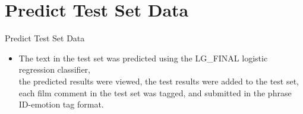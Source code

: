 \documentclass[
 size=14pt,
 paper=smartboard,  %
 mode=present, 		%
 display=slides, 	%
 style=tuliplab,  	%
 pauseslide,
 fleqn,leqno]{powerdot}
\begin{document}
\section{Predict Test Set Data}
\begin{slide}{Predict Test Set Data}
\begin{itemize}
  \item 
  The text in the test set was predicted using the LG_FINAL logistic regression classifier, 
\\the predicted results were viewed, the test results were added to the test set, 
 each film comment in the test set was tagged, and submitted in the phrase ID-emotion tag format.

\end{itemize}

\end{slide}

  
\end{document}
